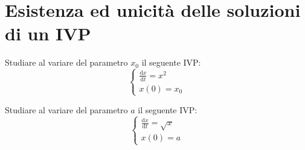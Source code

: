 \section{Esistenza ed unicità delle soluzioni di un IVP}%
\begin{ex}
    Studiare al variare del parametro $x_0$  il seguente IVP:
    \[
        \begin{cases}
            \frac{\text{d} x}{\text{d} t} = x^2\\
	    x(0) = x_0
        \end{cases}
    \] 
\end{ex}
\noindent
\begin{ex}
    Studiare al variare del parametro $a$ il seguente IVP:
    \[
        \begin{cases}
            \frac{\text{d} x}{\text{d} t} = \sqrt{x} \\
	    x(0)=a
        \end{cases}
    \] 
\end{ex}
\noindent

